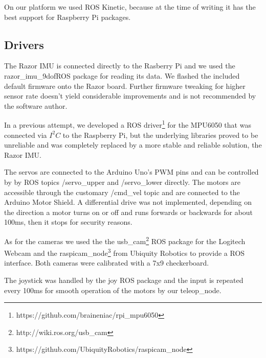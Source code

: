 \documentclass[class=report, crop=false]{standalone}
\begin{document}
On our platform we used ROS Kinetic, because at the time of writing it has the best support for Raspberry Pi packages.

\subsection{Drivers}\label{subsec:drivers}
The Razor IMU is connected directly to the Rasberry Pi and we used the razor\_imu\_9dof\footnotemark  ROS package for reading its data. We flashed the included default firmware onto the Razor board. Further firmware tweaking for higher sensor rate doesn't yield considerable improvements and is not recommended by the software author.


In a previous attempt, we developed a ROS driver\footnote{https://github.com/braineniac/rpi\_mpu6050} for the MPU6050 that was connected via $ I^2C $ to the Raspberry Pi, but the underlying libraries proved to be unreliable and was completely replaced by a more stable and reliable solution, the Razor IMU.

The servos are connected to the Arduino Uno's PWM pins and can be controlled by by ROS topics /servo\_upper and /servo\_lower directly. The motors are accessible through the customary /cmd\_vel topic and are connected to the Arduino Motor Shield. A differential drive was not implemented, depending on the direction a motor turns on or off and runs forwards or backwards for about 100ms, then it stops for security reasons.

As for the cameras we used the the usb\_cam\footnote{http://wiki.ros.org/usb\_cam} ROS package for the Logitech Webcam and the raspicam\_node\footnote{https://github.com/UbiquityRobotics/raspicam\_node} from Ubiquity Robotics to provide a ROS interface. Both cameras were calibrated with a 7x9 checkerboard.

The joystick was handled by the joy ROS package and the input is repeated every 100ms for smooth operation of the motors by our teleop\_node.



\end{document}
